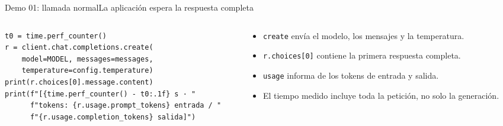 \begin{frame}[fragile]{Demo 01: llamada normal}{La aplicación espera la respuesta completa}
	\begin{columns}[T]
		\begin{column}{0.58\textwidth}
			\begin{lstlisting}
t0 = time.perf_counter()
r = client.chat.completions.create(
    model=MODEL, messages=messages,
    temperature=config.temperature)
print(r.choices[0].message.content)
print(f"[{time.perf_counter() - t0:.1f} s · "
      f"tokens: {r.usage.prompt_tokens} entrada / "
      f"{r.usage.completion_tokens} salida]")
\end{lstlisting}
		\end{column}
		\begin{column}{0.4\textwidth}
			\footnotesize
			\begin{itemize}
				\item \texttt{create} envía el modelo, los mensajes y la temperatura.
				\item \texttt{r.choices[0]} contiene la primera respuesta completa.
				\item \texttt{usage} informa de los tokens de entrada y salida.
				\item El tiempo medido incluye toda la petición, no solo la generación.
			\end{itemize}
		\end{column}
	\end{columns}
\end{frame}

